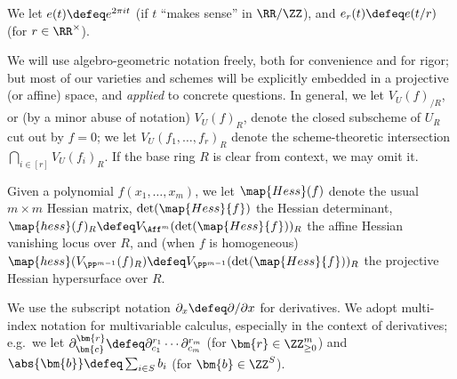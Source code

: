 \documentclass[12pt]{report}
\begin{document}
We let $e(t)\defeq e^{2\pi it}$ (if $t$ ``makes sense'' in $\RR/\ZZ$),
and $e_r(t)\defeq e(t/r)$ (for $r\in\RR^\times$).


We will use algebro-geometric notation freely, both for convenience and for rigor;
but most of our varieties and schemes will be explicitly embedded in a projective (or affine) space, and \emph{applied} to concrete questions.
In general,
we let $V_U(f)_{/R}$, or (by a minor abuse of notation) $V_U(f)_R$, denote the closed subscheme of $U_R$ cut out by $f=0$;
we let $V_U(f_1,\dots,f_r)_R$ denote the scheme-theoretic intersection $\bigcap_{i\in [r]} V_U(f_i)_R$.
If the base ring $R$ is clear from context, we may omit it.

Given a polynomial $f(x_1,\dots,x_m)$,
we let $\map{Hess}(f)$ denote the usual $m\times m$ Hessian matrix,
$\det(\map{Hess}{f})$ the Hessian determinant,
$\map{hess}(f)_R\defeq V_{\Aff^m}(\det(\map{Hess}{f}))_R$ the affine Hessian vanishing locus over $R$,
and (when $f$ is homogeneous)
$\map{hess}(V_{\PP^{m-1}}(f)_R)\defeq V_{\PP^{m-1}}(\det(\map{Hess}{f}))_R$ the projective Hessian hypersurface over $R$.

We use the subscript notation $\partial_x\defeq \partial/\partial x$ for derivatives.
We adopt multi-index notation
for multivariable calculus,
especially in the context of derivatives;
e.g.~we let $\partial_{\bm{c}}^{\bm{r}}\defeq\partial_{c_1}^{r_1}\cdots\partial_{c_m}^{r_m}$ (for $\bm{r}\in\ZZ_{\geq0}^m$) and $\abs{\bm{b}}\defeq\sum_{i\in S}b_i$ (for $\bm{b}\in\ZZ^S$).
\end{document}
